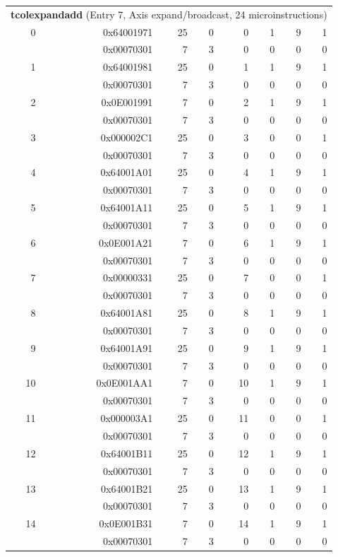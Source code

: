 \begin{longtable}{r r r r r r r r}
\multicolumn{8}{l}{\textbf{tcolexpandadd} (Entry 7, Axis expand/broadcast, 24 microinstructions)} \\
0 & 0x64001971 & 25 & 0 & 0 & 1 & 9 & 1 \\
  & 0x00070301 & 7 & 3 & 0 & 0 & 0 & 0 \\
1 & 0x64001981 & 25 & 0 & 1 & 1 & 9 & 1 \\
  & 0x00070301 & 7 & 3 & 0 & 0 & 0 & 0 \\
2 & 0x0E001991 & 7 & 0 & 2 & 1 & 9 & 1 \\
  & 0x00070301 & 7 & 3 & 0 & 0 & 0 & 0 \\
3 & 0x000002C1 & 25 & 0 & 3 & 0 & 0 & 1 \\
  & 0x00070301 & 7 & 3 & 0 & 0 & 0 & 0 \\
4 & 0x64001A01 & 25 & 0 & 4 & 1 & 9 & 1 \\
  & 0x00070301 & 7 & 3 & 0 & 0 & 0 & 0 \\
5 & 0x64001A11 & 25 & 0 & 5 & 1 & 9 & 1 \\
  & 0x00070301 & 7 & 3 & 0 & 0 & 0 & 0 \\
6 & 0x0E001A21 & 7 & 0 & 6 & 1 & 9 & 1 \\
  & 0x00070301 & 7 & 3 & 0 & 0 & 0 & 0 \\
7 & 0x00000331 & 25 & 0 & 7 & 0 & 0 & 1 \\
  & 0x00070301 & 7 & 3 & 0 & 0 & 0 & 0 \\
8 & 0x64001A81 & 25 & 0 & 8 & 1 & 9 & 1 \\
  & 0x00070301 & 7 & 3 & 0 & 0 & 0 & 0 \\
9 & 0x64001A91 & 25 & 0 & 9 & 1 & 9 & 1 \\
  & 0x00070301 & 7 & 3 & 0 & 0 & 0 & 0 \\
10 & 0x0E001AA1 & 7 & 0 & 10 & 1 & 9 & 1 \\
  & 0x00070301 & 7 & 3 & 0 & 0 & 0 & 0 \\
11 & 0x000003A1 & 25 & 0 & 11 & 0 & 0 & 1 \\
  & 0x00070301 & 7 & 3 & 0 & 0 & 0 & 0 \\
12 & 0x64001B11 & 25 & 0 & 12 & 1 & 9 & 1 \\
  & 0x00070301 & 7 & 3 & 0 & 0 & 0 & 0 \\
13 & 0x64001B21 & 25 & 0 & 13 & 1 & 9 & 1 \\
  & 0x00070301 & 7 & 3 & 0 & 0 & 0 & 0 \\
14 & 0x0E001B31 & 7 & 0 & 14 & 1 & 9 & 1 \\
  & 0x00070301 & 7 & 3 & 0 & 0 & 0 & 0 \\

\end{longtable}
